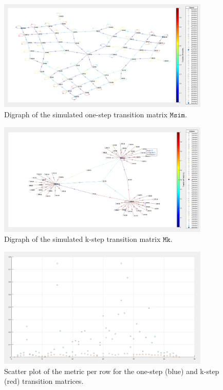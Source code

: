 \documentclass[12pt]{article}
\begin{document}
\begin{figure}
    \centering
    \includegraphics[width=0.9\textwidth]{media/7.jpg}
    \caption{Digraph of the simulated one-step transition matrix $\texttt{Msim}$.}
    \label{fig:myimage}
\end{figure}

\begin{figure}
    \centering
    \includegraphics[width=0.9\textwidth]{media/8.jpg}
    \caption{Digraph of the simulated k-step transition matrix $\texttt{Mk}$.}
    \label{fig:myimage}
\end{figure}

\begin{figure}
    \centering
    \includegraphics[width=0.9\textwidth]{media/9.jpg}
    \caption{Scatter plot of the metric per row for the one-step (blue) and k-step (red) transition matrices.}
    \label{fig:myimage}
\end{figure}
\end{document}

